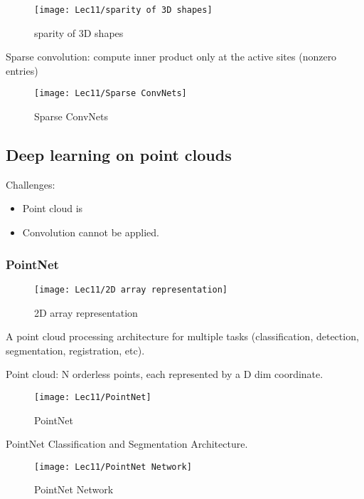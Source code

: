 \begin{figure}[H]
    \centering
    \texttt{[image: Lec11/sparity of 3D shapes]}
    \caption{sparity of 3D shapes}
\end{figure}

Sparse convolution: compute inner product only at the active sites (nonzero entries)

\begin{figure}[H]
    \centering
    \texttt{[image: Lec11/Sparse ConvNets]}
    \caption{Sparse ConvNets}
\end{figure}

\subsection{Deep learning on point clouds}
Challenges:
\begin{itemize}
    \item Point cloud is 
    \item Convolution cannot be applied. 
\end{itemize}

\subsubsection{PointNet}

\begin{wrapfigure}[5]{r}{0.38\textwidth}
    \centering
    \texttt{[image: Lec11/2D array representation]}
    \caption{2D array representation}
\end{wrapfigure}

A point cloud processing architecture for multiple tasks (classification, detection, segmentation, registration, etc). 

Point cloud: N orderless points, each represented by a D dim coordinate. 

\quad

\quad

\begin{figure}[H]
    \centering
    \texttt{[image: Lec11/PointNet]}
    \caption{PointNet}
\end{figure}

PointNet Classification and Segmentation Architecture. 

\begin{figure}[H]
    \centering
    \texttt{[image: Lec11/PointNet Network]}
    \caption{PointNet Network}
\end{figure}

